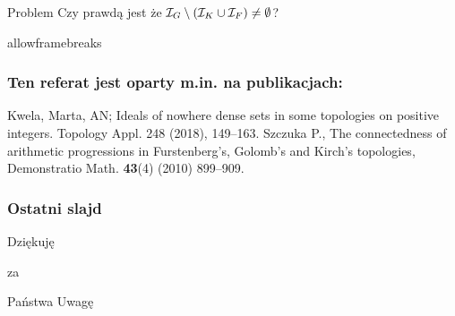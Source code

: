 \documentclass{beamer}
\begin{document}
\begin{frame}

\begin{block}{Problem}
Czy prawdą jest że $\mathcal I_G\setminus (\mathcal I_K\cup \mathcal I_F) \not= \emptyset$?
\end{block}
\end{frame}
\begin{frame}{allowframebreaks}
\frametitle{Ten referat jest oparty m.in. na publikacjach:}
\beamertemplatebookbibitems
\begin{thebibliography}{10}{
 {\sc Kwela, Marta, AN;} {Ideals of nowhere dense sets in some topologies on positive integers.} Topology Appl. 248 (2018), 149–163.
}
{\sc Szczuka P.}, {The connectedness of arithmetic progressions in Furstenberg's, Golomb's and Kirch's topologies},
Demonstratio Math. {\bf 43}(4) (2010) 899--909.
\end{thebibliography}
\end{frame}

\begin{frame}\frametitle{Ostatni slajd}
\begin{center}{\Huge Dziękuję}\end{center}
\begin{center}{\Huge za}\end{center}
\begin{center}{\Huge Państwa Uwagę}\end{center}
\end{frame}
\end{document}
